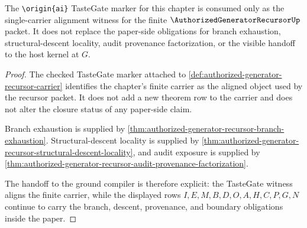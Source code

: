 \begin{theorem}
\label{thm:authorized-generator-recursor-ground-compiler-handoff}
The \texttt{\textbackslash origin\{ai\}} TasteGate marker for this chapter is consumed only as the single-carrier alignment witness for the finite $\AuthorizedGeneratorRecursorUp$ packet. It does not replace the paper-side obligations for branch exhaustion, structural-descent locality, audit provenance factorization, or the visible handoff to the host kernel at $G$.
\end{theorem}
\begin{proof}
The checked TasteGate marker attached to \autoref{def:authorized-generator-recursor-carrier} identifies the chapter's finite carrier as the aligned object used by the recursor packet. It does not add a new theorem row to the carrier and does not alter the closure status of any paper-side claim.

Branch exhaustion is supplied by \autoref{thm:authorized-generator-recursor-branch-exhaustion}. Structural-descent locality is supplied by \autoref{thm:authorized-generator-recursor-structural-descent-locality}, and audit exposure is supplied by \autoref{thm:authorized-generator-recursor-audit-provenance-factorization}.

The handoff to the ground compiler is therefore explicit: the TasteGate witness aligns the finite carrier, while the displayed rows $I,E,M,B,D,O,A,H,C,P,G,N$ continue to carry the branch, descent, provenance, and boundary obligations inside the paper.
\end{proof}

